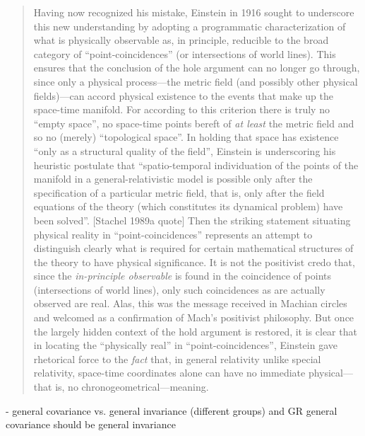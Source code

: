 \begin{quote}
    Having now recognized his mistake, Einstein in 1916 sought to underscore this new understanding by adopting a programmatic characterization of what is physically observable as, in principle, reducible to the broad category of ``point-coincidences'' (or intersections of world lines).  This ensures that the conclusion of the hole argument can no longer go through, since only a physical process---the metric field (and possibly other physical fields)---can accord physical existence to the events that make up the space-time manifold.  For according to this criterion there is truly no ``empty space'', no space-time points bereft of \emph{at least} the metric field and so no (merely) ``topological space''.  In holding that space has existence ``only as a structural quality of the field'', Einstein is underscoring his heuristic postulate that ``spatio-temporal individuation of the points of the manifold in a general-relativistic model is possible only after the specification of a particular metric field, that is, only after the field equations of the theory (which constitutes its dynamical problem) have been solved''.  [Stachel 1989a quote]  Then the striking statement situating physical reality in ``point-coincidences'' represents an attempt to distinguish clearly what is required for certain mathematical structures of the theory to have physical significance.  It is not the positivist credo that, since the \emph{in-principle observable} is found in the coincidence of points (intersections of world lines), only such coincidences as are actually observed are real.  Alas, this was the message received in Machian circles and welcomed as a confirmation of Mach's positivist philosophy.  But once the largely hidden context of the hold argument is restored, it is clear that in locating the ``physically real'' in ``point-coincidences'', Einstein gave rhetorical force to the \emph{fact} that, in general relativity unlike special relativity, space-time coordinates alone can have no immediate physical---that is, no chronogeometrical---meaning.
    
    \citep[p. 21-22]{Ryckman2005}
\end{quote}

- general covariance vs. general invariance (different groups) and GR general covariance should be general invariance


